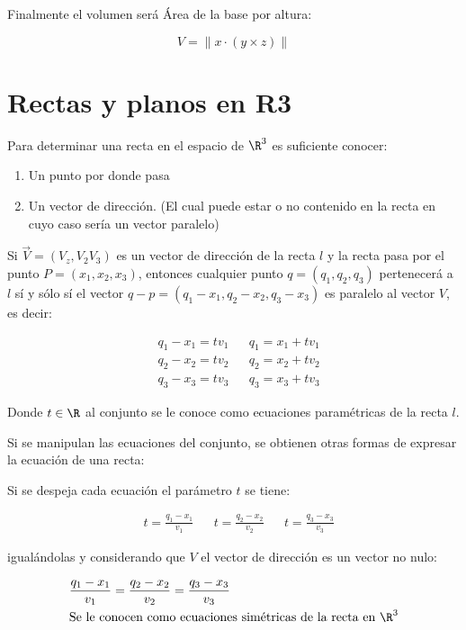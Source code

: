 Finalmente el volumen será Área de la base por altura:

\begin{equation*}
	V=\left\lVert x\cdot (y\times z)\right\rVert
\end{equation*}


\section{Rectas y planos en R3}

\begin{definition}[Rectas]
	Para determinar una recta en el espacio de $\R^3$ es suficiente conocer:
	\begin{enumerate}
		\item Un punto por donde pasa
		\item Un vector de dirección. (El cual puede estar o no contenido en la recta en cuyo caso sería un vector paralelo)
	\end{enumerate}
\end{definition}

Si $\overrightarrow{V}=(V_z,V_2V_3)$ es un vector de dirección de la recta $l$ y la recta pasa por el punto $P=(x_1,x_2,x_3)$, entonces cualquier punto $q=(q_1,q_2,q_3)$
pertenecerá a $l$ sí y sólo sí el vector $q-p=(q_1-x_1,q_2-x_2,q_3-x_3)$ es paralelo al vector $V$, es decir:

\begin{align*}
	 & q_1-x_1=tv_1 &  & q_1=x_1+tv_1 \\
	 & q_2-x_2=tv_2 &  & q_2=x_2+tv_2 \\
	 & q_3-x_3=tv_3 &  & q_3=x_3+tv_3
\end{align*}

Donde $t\in \R$ al conjunto se le conoce como ecuaciones paramétricas de la recta $l$.

Si se manipulan las ecuaciones del conjunto, se obtienen otras formas de expresar la ecuación de una recta:

Si se despeja cada ecuación el parámetro $t$ se tiene:

\begin{align*}
	 & t=\frac{q_1-x_1}{v_1} &  & t=\frac{q_2-x_2}{v_2} &  & t=\frac{q_3-x_3}{v_3}
\end{align*}

igualándolas y considerando que $V$ el vector de dirección es un vector no nulo:

\begin{align*}
	 & \frac{q_1-x_1}{v_1}=\frac{q_2-x_2}{v_2}=\frac{q_3-x_3}{v_3}         \\
	 & \text{Se le conocen como ecuaciones simétricas de la recta en }\R^3
\end{align*}

